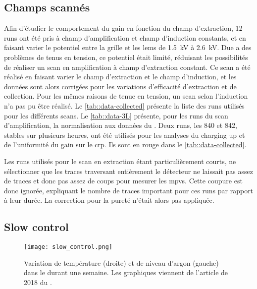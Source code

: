     \subsection{Champs scannés}

      
      

      Afin d'étudier le comportement du gain en fonction du champ d'extraction, 12 runs ont été pris à champ d'amplification et champ d'induction constants, et en faisant varier le potentiel entre la grille et les \glspl{lem} de \SI{1.5}{\kilo\volt} à \SI{2.6}{\kilo\volt}. Due a des problèmes de tenus en tension, ce potentiel était limité, réduisant les possibilités de réaliser un scan en amplification à champ d'extraction constant. Ce scan a été réalisé en faisant varier le champ d'extraction et le champ d'induction, et les données sont alors corrigées pour les variations d'efficacité d'extraction et de collection. Pour les mêmes raisons de tenue en tension, un scan selon l'induction n'a pas pu être réalisé. Le \autoref{tab::data-collected} présente la liste des runs utilisés pour les différents scans. Le \autoref{tab::data-3L} présente, pour les runs du scan d'amplification, la normalisation aux données du \threeL{}. Deux runs, les 840 et 842, stables sur plusieurs heures, ont été utilisés pour les analyses du charging up et de l'uniformité du gain sur le \gls{crp}. Ils sont en rouge dans le \autoref{tab::data-collected}.

      Les runs utilisés pour le scan en extraction étant particulièrement courts, ne sélectionner que les traces traversant entièrement le détecteur ne laissait pas assez de traces et donc pas assez de coups pour mesurer les \glspl{mpv}. Cette coupure est donc ignorée, expliquant le nombre de traces important pour ces runs par rapport à leur durée. La correction pour la pureté n'était alors pas appliquée.

    \subsection{Slow control}\label{sec::slow_control}

      \begin{figure}[htbp]
        \centering
        \texttt{[image: slow\_control.png]}
        \caption[Variation de température et de niveau d'argon dans le \TOO{}]{\label{fig::slow_control}Variation de température (droite) et de niveau d'argon (gauche) dans le \TOO{} durant une semaine. Les graphiques viennent de l'article de 2018 du \TOO{} \cite{Aimard2018}.}
      \end{figure}

